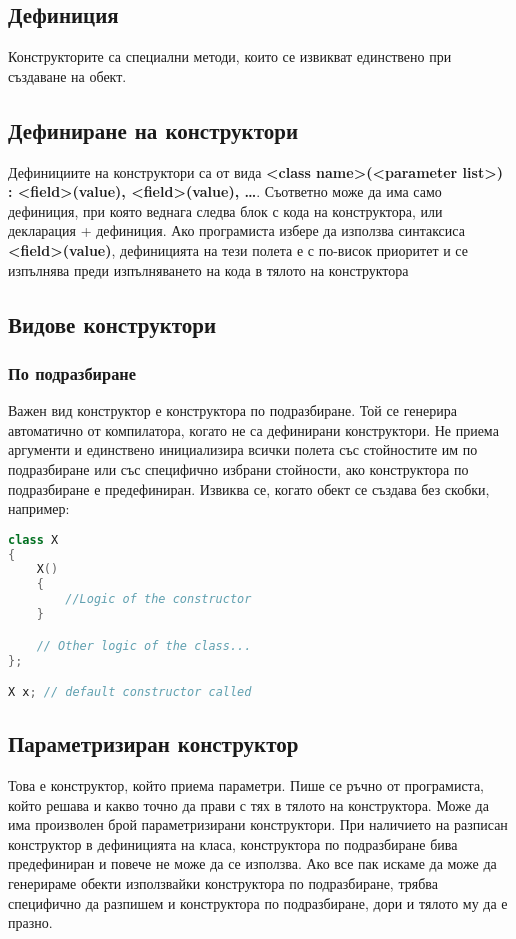 \documentclass[fleqn,12pt]{article}
\begin{document}
\subsection{Дефиниция}
Конструкторите са специални методи, които се извикват единствено при създаване на обект.

\subsection{Дефиниране на конструктори}
Дефинициите на конструктори са от вида \textbf{<class name>(<parameter list>) : <field>(value), <field>(value), \dots}.
Съответно може да има само дефиниция, при която веднага следва блок с кода на конструктора,
или декларация + дефиниция. Ако програмиста избере да използва синтаксиса \textbf{<field>(value)}, дефиницията на тези полета е с по-висок приоритет и се изпълнява преди изпълняването на кода в тялото на конструктора 

\subsection{Видове конструктори}
\subsubsection{По подразбиране}
Важен вид конструктор е конструктора по подразбиране. Той се генерира автоматично от компилатора, 
когато не са дефинирани конструктори. Не приема аргументи и единствено инициализира всички полета със стойностите им по подразбиране или със специфично избрани стойности, ако конструктора по подразбиране е предефиниран.
Извиква се, когато обект се създава без скобки, например:
\begin{lstlisting}[language=C++, caption=Default constructor]
class X
{
    X()
    {
        //Logic of the constructor
    }

    // Other logic of the class...
};

X x; // default constructor called
\end{lstlisting}

\subsection{Параметризиран конструктор}
Това е конструктор, който приема параметри. Пише се ръчно от програмиста, който решава и какво точно да прави с тях
в тялото на конструктора. Може да има произволен брой параметризирани конструктори. При наличието на разписан конструктор в дефиницията на класа, конструктора по подразбиране бива предефиниран и повече не може да се използва. Ако все пак искаме да може да генерираме обекти използвайки конструктора по подразбиране, трябва специфично да разпишем и конструктора по подразбиране, дори и тялото му да е празно.
\end{document}
